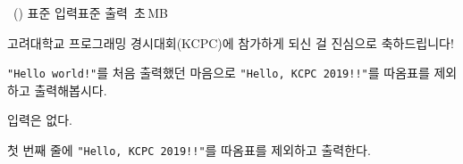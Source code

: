 \begin{problem}{\kcpcpprobkcpc\ (\kcpcpprobkcpcshort)}
    {표준 입력}{표준 출력}
    {\kcpcpprobkcpctime\,초}{\kcpcpprobkcpcmemory\,MB}{}
    
    고려대학교 프로그래밍 경시대회(KCPC)에 참가하게 되신 걸 진심으로 축하드립니다!
    
    \texttt{"Hello world!"}를 처음 출력했던 마음으로 \texttt{"Hello, KCPC 2019!!"}를 따옴표를 제외하고 출력해봅시다.
    
    \InputFile
    입력은 없다.
    
    \OutputFile
    첫 번째 줄에 \texttt{"Hello, KCPC 2019!!"}를 따옴표를 제외하고 출력한다.
   
    \Examples
    
    \begin{example}
    \end{example}
\end{problem}

